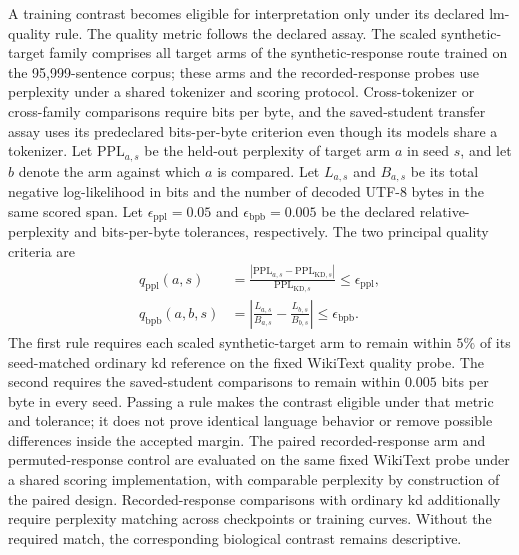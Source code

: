 A training contrast becomes eligible for interpretation only under its declared \ac{lm}-quality rule.
The quality metric follows the declared assay.
The scaled synthetic-target family comprises all target arms of the synthetic-response route trained on the 95,999-sentence corpus; these arms and the recorded-response probes use perplexity under a shared tokenizer and scoring protocol.
Cross-tokenizer or cross-family comparisons require bits per byte, and the saved-student transfer assay uses its predeclared bits-per-byte criterion even though its models share a tokenizer.
Let \(\mathrm{PPL}_{a,s}\) be the held-out perplexity of target arm \(a\) in seed \(s\), and let \(b\) denote the arm against which \(a\) is compared.
Let \(L_{a,s}\) and \(B_{a,s}\) be its total negative log-likelihood in bits and the number of decoded UTF-8 bytes in the same scored span.
Let \(\epsilon_{\mathrm{ppl}}=0.05\) and \(\epsilon_{\mathrm{bpb}}=0.005\) be the declared relative-perplexity and bits-per-byte tolerances, respectively.
The two principal quality criteria are
\begin{equation}
\begin{aligned}
q_{\mathrm{ppl}}(a,s)
&=
\frac{
\left|
\mathrm{PPL}_{a,s}
-
\mathrm{PPL}_{\mathrm{KD},s}
\right|
}{
\mathrm{PPL}_{\mathrm{KD},s}
}
\leq \epsilon_{\mathrm{ppl}},
\\
q_{\mathrm{bpb}}(a,b,s)
&=
\left|
\frac{L_{a,s}}{B_{a,s}}
-
\frac{L_{b,s}}{B_{b,s}}
\right|
\leq \epsilon_{\mathrm{bpb}}.
\end{aligned}
\label{eq:quality-eligibility}
\end{equation}
The first rule requires each scaled synthetic-target arm to remain within \(5\%\) of its seed-matched ordinary \ac{kd} reference on the fixed WikiText quality probe.
The second requires the saved-student comparisons to remain within \(0.005\) bits per byte in every seed.
Passing a rule makes the contrast eligible under that metric and tolerance; it does not prove identical language behavior or remove possible differences inside the accepted margin.
The paired recorded-response arm and permuted-response control are evaluated on the same fixed WikiText probe under a shared scoring implementation, with comparable perplexity by construction of the paired design.
Recorded-response comparisons with ordinary \ac{kd} additionally require perplexity matching across checkpoints or training curves.
Without the required match, the corresponding biological contrast remains descriptive.

